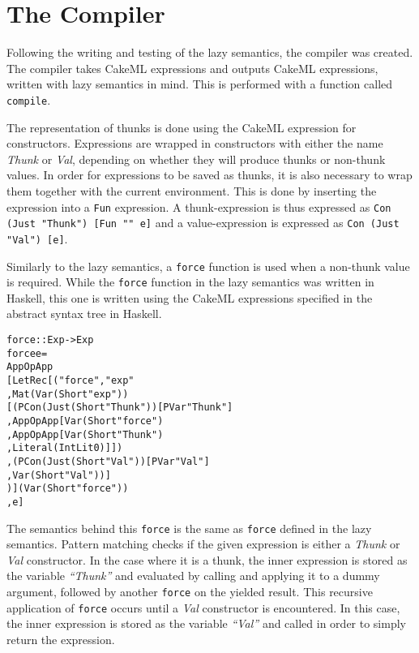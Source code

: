 \section{The Compiler}

Following the writing and testing of the lazy semantics, the compiler was
created. The compiler takes CakeML expressions and outputs CakeML expressions,
written with lazy semantics in mind. This is performed with a function called
\texttt{compile}.

The representation of thunks is done using the CakeML expression for
constructors. Expressions are wrapped in constructors with either the name
\textit{Thunk} or \textit{Val}, depending on whether they will produce thunks or
non-thunk values. In order for expressions to be saved as thunks, it is also
necessary to wrap them together with the current environment. This is done by
inserting the expression into a \texttt{Fun} expression. A thunk-expression is
thus expressed as \texttt{Con (Just "Thunk") [Fun "" e]} and a value-expression
is expressed as \texttt{Con (Just "Val") [e]}.

Similarly to the lazy semantics, a \texttt{force} function is used when a
non-thunk value is required. While the \texttt{force} function in the lazy
semantics was written in Haskell, this one is written using the CakeML
expressions specified in the abstract syntax tree in Haskell.

\vspace{\fboxsep}
\begin{minipage}{\linewidth}
\begin{alltt}
force :: Exp -> Exp
force e =
App OpApp
  [LetRec [("force", "exp"
          , Mat (Var (Short "exp"))
            [(PCon (Just (Short "Thunk")) [PVar "Thunk"]
             , App OpApp [Var (Short "force")
                         , App OpApp [Var (Short "Thunk")
                                     , Literal (IntLit 0)]])
            ,(PCon (Just (Short "Val")) [PVar "Val"]
             , Var (Short "Val"))]
          )] (Var (Short "force"))
  , e]
\end{alltt}
\end{minipage}
\vspace{\fboxsep}

\noindent The semantics behind this \texttt{force} is the same as \texttt{force} defined
in the lazy semantics. Pattern matching checks if the given expression is either
a \textit{Thunk} or \textit{Val} constructor. In the case where it is a thunk,
the inner expression is stored as the variable \textit{``Thunk''} and evaluated
by calling and applying it to a dummy argument, followed by another
\texttt{force} on the yielded result. This recursive application of
\texttt{force} occurs until a \textit{Val} constructor is encountered. In this
case, the inner expression is stored as the variable \textit{``Val''} and called
in order to simply return the expression.

